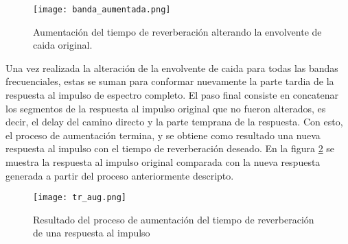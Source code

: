 \begin{figure}[H]
	\centering{}
	\texttt{[image: banda\_aumentada.png]}
	\caption{Aumentación del tiempo de reverberación alterando la envolvente de caida original.}
	\label{fig:banda_aumentada}
\end{figure}

Una vez realizada la alteración de la envolvente de caida para todas las bandas frecuenciales, estas se suman para conformar nuevamente la parte tardia de la respuesta al impulso de espectro completo. El paso final consiste en concatenar los segmentos de la respuesta al impulso original que no fueron alterados, es decir, el delay del camino directo y la parte temprana de la respuesta. Con esto, el proceso de aumentación termina, y se obtiene como resultado una nueva respuesta al impulso con el tiempo de reverberación deseado. En la figura \ref{fig:salida_aumentacion_tr} se muestra la respuesta al impulso original comparada con la nueva respuesta generada a partir del proceso anteriormente descripto. 

\begin{figure}[H]
	\centering{}
	\texttt{[image: tr\_aug.png]}
	\caption{Resultado del proceso de aumentación del tiempo de reverberación de una respuesta al impulso}
	\label{fig:salida_aumentacion_tr}
\end{figure}






